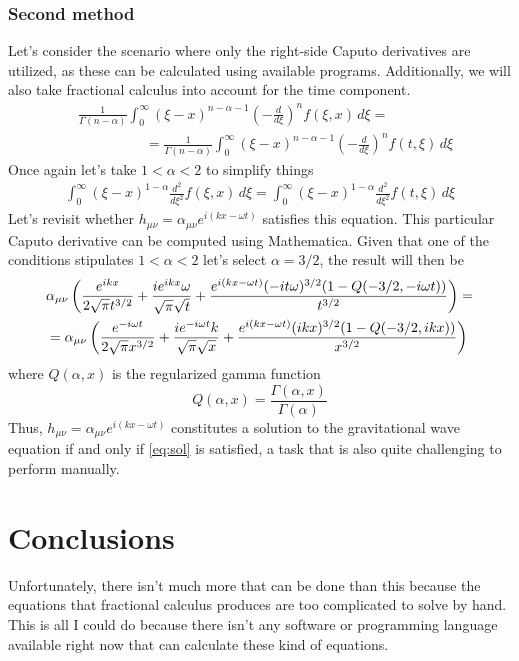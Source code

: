 \documentclass[a4paper,12pt]{extarticle}
\newcommand{\mn}{{\mu\nu}}
\numberwithin{equation}{subsection}
\begin{document}
\subsubsection{Second method}
Let's consider the scenario where only the right-side Caputo derivatives are utilized, as these can be calculated using available programs. Additionally, we will also take fractional calculus into account for the time component.
\begin{align*}
&\frac{1}{\Gamma(n-\alpha)}\int_0^\infty(\xi-x)^{n-\alpha-1}\left(-\frac{d}{d\xi}\right)^nf(\xi,x)\,d\xi=\\&\hspace{2cm}=\frac{1}{\Gamma(n-\alpha)}\int_0^\infty(\xi-x)^{n-\alpha-1}\left(-\frac{d}{d\xi}\right)^nf(t,\xi)\,d\xi
\end{align*}
Once again let's take $1<\alpha<2$ to simplify things
\begin{align*}
\int_0^\infty(\xi-x)^{1-\alpha}\frac{d^2}{d\xi^2}f(\xi,x)\,d\xi=\int_0^\infty(\xi-x)^{1-\alpha}\frac{d^2}{d\xi^2}f(t,\xi)\,d\xi
\end{align*}
Let's revisit whether $h_\mn=\alpha_\mn e^{i(kx-\omega t)}$ satisfies this equation. This particular Caputo derivative can be computed using Mathematica. Given that one of the conditions stipulates $1<\alpha<2$ let's select $\alpha=3/2$, the result will then be
\begin{equation}
\label{eq:sol}
\begin{fleqn}
\begin{aligned}
&\alpha_\mn\left(\frac{e^{ikx}}{2\sqrt \pi t^{3/2}}+\frac{ie^{ikx}\omega}{\sqrt \pi \sqrt t}+\frac{e^{i(kx-\omega t)}(-it\omega)^{3/2}(1-Q(-3/2,-i\omega t))}{t^{3/2}}\right)=\\
&=\alpha_\mn\left(\frac{e^{-i\omega t}}{2\sqrt \pi x^{3/2}}+\frac{ie^{-i\omega t}k}{\sqrt \pi \sqrt x}+\frac{e^{i(kx-\omega t)}(ikx)^{3/2}(1-Q(-3/2,ikx))}{x^{3/2}}\right)
\end{aligned}
\end{fleqn}
\end{equation}
where $Q(\alpha,x)$ is the regularized gamma function
\begin{equation*}
Q(\alpha,x)=\frac{\Gamma(\alpha,x)}{\Gamma(\alpha)}
\end{equation*}
Thus, $h_\mn=\alpha_\mn e^{i(kx-\omega t)}$ constitutes a solution to the gravitational wave equation if and only if \eqref{eq:sol} is satisfied, a task that is also quite challenging to perform manually.
\section{Conclusions}
Unfortunately, there isn't much more that can be done than this because the equations that fractional calculus produces are too complicated to solve by hand. This is all I could do because there isn't any software or programming language available right now that can calculate these kind of equations.
\newpage
\nocite{*}


\end{document}
